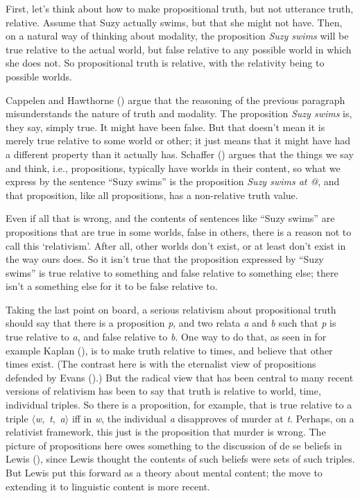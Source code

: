 \documentclass[
  11pt,
  letterpaper,
  DIV=11,
  numbers=noendperiod,
  twoside]{scrartcl}
\begin{document}
First, let's think about how to make propositional truth, but not
utterance truth, relative. Assume that Suzy actually swims, but that she
might not have. Then, on a natural way of thinking about modality, the
proposition \emph{Suzy swims} will be true relative to the actual world,
but false relative to any possible world in which she does not. So
propositional truth is relative, with the relativity being to possible
worlds.

Cappelen and Hawthorne ()
argue that the reasoning of the previous paragraph misunderstands the
nature of truth and modality. The proposition \emph{Suzy swims} is, they
say, simply true. It might have been false. But that doesn't mean it is
merely true relative to some world or other; it just means that it might
have had a different property than it actually has. Schaffer
() argues that the things we say and
think, i.e., propositions, typically have worlds in their content, so
what we express by the sentence ``Suzy swims'' is the proposition
\emph{Suzy swims at @}, and that proposition, like all propositions, has
a non-relative truth value.

Even if all that is wrong, and the contents of sentences like ``Suzy
swims'' are propositions that are true in some worlds, false in others,
there is a reason not to call this `relativism'. After all, other worlds
don't exist, or at least don't exist in the way ours does. So it isn't
true that the proposition expressed by ``Suzy swims'' is true relative
to something and false relative to something else; there isn't a
something else for it to be false relative to.

Taking the last point on board, a serious relativism about propositional
truth should say that there is a proposition \emph{p}, and two relata
\emph{a} and \emph{b} such that \emph{p} is true relative to \emph{a},
and false relative to \emph{b}. One way to do that, as seen in for
example Kaplan (), is to make truth
relative to times, and believe that other times exist. (The contrast
here is with the eternalist view of propositions defended by Evans
().) But the radical view that has been
central to many recent versions of relativism has been to say that truth
is relative to world, time, individual triples. So there is a
proposition, for example, that is true relative to a triple
\(\langle\)\emph{w},~\emph{t},~\emph{a}\(\rangle\) iff in \emph{w}, the
individual \emph{a} disapproves of murder at \emph{t}. Perhaps, on a
relativist framework, this just is the proposition that murder is wrong.
The picture of propositions here owes something to the discussion of de
se beliefs in Lewis (), since Lewis
thought the contents of such beliefs were sets of such triples. But
Lewis put this forward as a theory about mental content; the move to
extending it to linguistic content is more recent.
\end{document}
